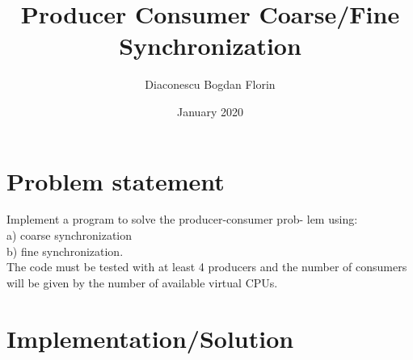 \documentclass{article}
\title{Producer Consumer Coarse/Fine Synchronization}
\author{Diaconescu Bogdan Florin}
\date{January 2020}
\begin{document}
\maketitle

\section{Problem statement}
Implement a program to solve the producer-consumer prob-
lem using:\\
a) coarse synchronization\\
b) fine synchronization.\\
The code must be tested with at least 4 producers and the number of consumers
will be given by the number of available virtual CPUs.

\section{Implementation/Solution}
\end{document}
